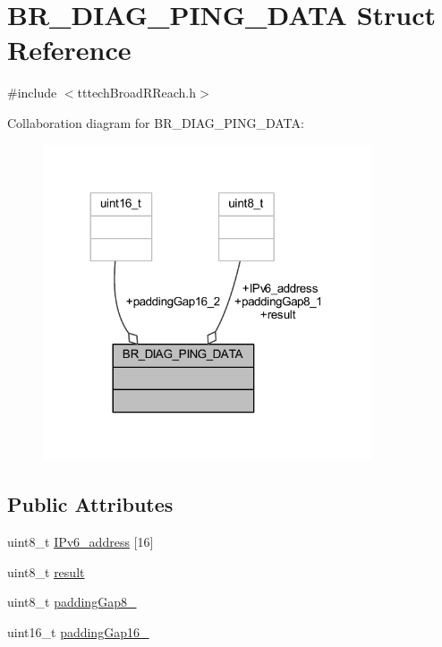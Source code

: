 \hypertarget{struct_b_r___d_i_a_g___p_i_n_g___d_a_t_a}{}\section{B\+R\+\_\+\+D\+I\+A\+G\+\_\+\+P\+I\+N\+G\+\_\+\+D\+A\+TA Struct Reference}
\label{struct_b_r___d_i_a_g___p_i_n_g___d_a_t_a}


{\ttfamily \#include $<$tttech\+Broad\+R\+Reach.\+h$>$}



Collaboration diagram for B\+R\+\_\+\+D\+I\+A\+G\+\_\+\+P\+I\+N\+G\+\_\+\+D\+A\+TA\+:
\nopagebreak
\begin{figure}[H]
\begin{center}
\leavevmode
\includegraphics[width=275pt]{struct_b_r___d_i_a_g___p_i_n_g___d_a_t_a__coll__graph}
\end{center}
\end{figure}
\subsection*{Public Attributes}
\begin{DoxyCompactItemize}
\item 
uint8\+\_\+t \mbox{\hyperlink{struct_b_r___d_i_a_g___p_i_n_g___d_a_t_a_ab2996a088cc43e9ab39b5d108d95682f}{I\+Pv6\+\_\+address}} \mbox{[}16\mbox{]}
\item 
uint8\+\_\+t \mbox{\hyperlink{struct_b_r___d_i_a_g___p_i_n_g___d_a_t_a_ac31c42bf1a1783d9c6aa3de70a0b29cf}{result}}
\item 
uint8\+\_\+t \mbox{\hyperlink{struct_b_r___d_i_a_g___p_i_n_g___d_a_t_a_a232a176e3dad7eaba4dfc978610042e8}{padding\+Gap8\+\_}}
\item 
uint16\+\_\+t \mbox{\hyperlink{struct_b_r___d_i_a_g___p_i_n_g___d_a_t_a_a1c4c77e6f2aabcaec588628a55a25bed}{padding\+Gap16\+\_}}
\end{DoxyCompactItemize}


